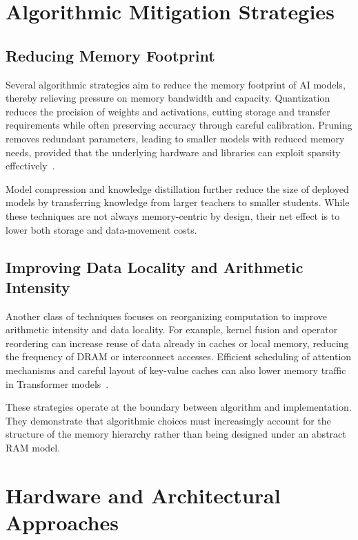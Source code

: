 \documentclass[conference]{IEEEtran}
\begin{document}
\section{Algorithmic Mitigation Strategies}
\label{sec:algorithms}

\subsection{Reducing Memory Footprint}

Several algorithmic strategies aim to reduce the memory footprint of AI models, thereby relieving pressure on memory bandwidth and capacity. Quantization reduces the precision of weights and activations, cutting storage and transfer requirements while often preserving accuracy through careful calibration. Pruning removes redundant parameters, leading to smaller models with reduced memory needs, provided that the underlying hardware and libraries can exploit sparsity effectively~\cite{gholami2024ai,roy2025breaking}.

Model compression and knowledge distillation further reduce the size of deployed models by transferring knowledge from larger teachers to smaller students. While these techniques are not always memory-centric by design, their net effect is to lower both storage and data-movement costs.

\subsection{Improving Data Locality and Arithmetic Intensity}

Another class of techniques focuses on reorganizing computation to improve arithmetic intensity and data locality. For example, kernel fusion and operator reordering can increase reuse of data already in caches or local memory, reducing the frequency of DRAM or interconnect accesses. Efficient scheduling of attention mechanisms and careful layout of key-value caches can also lower memory traffic in Transformer models~\cite{gholami2024ai}.

These strategies operate at the boundary between algorithm and implementation. They demonstrate that algorithmic choices must increasingly account for the structure of the memory hierarchy rather than being designed under an abstract RAM model.

\section{Hardware and Architectural Approaches}
\label{sec:hardware}
\end{document}
